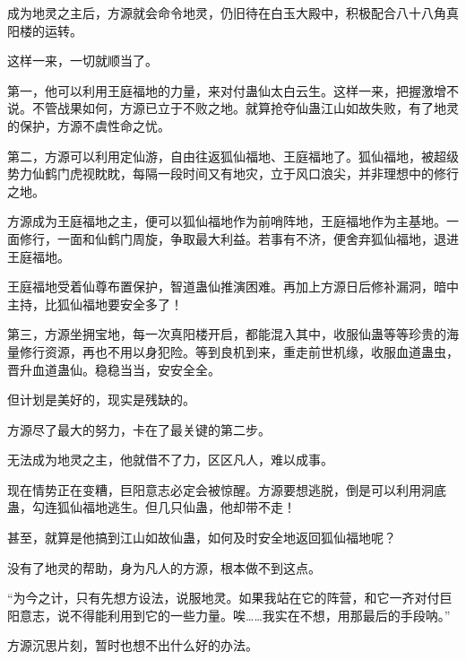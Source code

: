 \begin{this_body}
成为地灵之主后，方源就会命令地灵，仍旧待在白玉大殿中，积极配合八十八角真阳楼的运转。

这样一来，一切就顺当了。

第一，他可以利用王庭福地的力量，来对付蛊仙太白云生。这样一来，把握激增不说。不管战果如何，方源已立于不败之地。就算抢夺仙蛊江山如故失败，有了地灵的保护，方源不虞性命之忧。

第二，方源可以利用定仙游，自由往返狐仙福地、王庭福地了。狐仙福地，被超级势力仙鹤门虎视眈眈，每隔一段时间又有地灾，立于风口浪尖，并非理想中的修行之地。

方源成为王庭福地之主，便可以狐仙福地作为前哨阵地，王庭福地作为主基地。一面修行，一面和仙鹤门周旋，争取最大利益。若事有不济，便舍弃狐仙福地，退进王庭福地。

王庭福地受着仙尊布置保护，智道蛊仙推演困难。再加上方源日后修补漏洞，暗中主持，比狐仙福地要安全多了！

第三，方源坐拥宝地，每一次真阳楼开启，都能混入其中，收服仙蛊等等珍贵的海量修行资源，再也不用以身犯险。等到良机到来，重走前世机缘，收服血道蛊虫，晋升血道蛊仙。稳稳当当，安安全全。

但计划是美好的，现实是残缺的。

方源尽了最大的努力，卡在了最关键的第二步。

无法成为地灵之主，他就借不了力，区区凡人，难以成事。

现在情势正在变糟，巨阳意志必定会被惊醒。方源要想逃脱，倒是可以利用洞底蛊，勾连狐仙福地逃生。但几只仙蛊，他却带不走！

甚至，就算是他搞到江山如故仙蛊，如何及时安全地返回狐仙福地呢？

没有了地灵的帮助，身为凡人的方源，根本做不到这点。

“为今之计，只有先想方设法，说服地灵。如果我站在它的阵营，和它一齐对付巨阳意志，说不得能利用到它的一些力量。唉……我实在不想，用那最后的手段呐。”

方源沉思片刻，暂时也想不出什么好的办法。

\end{this_body}

